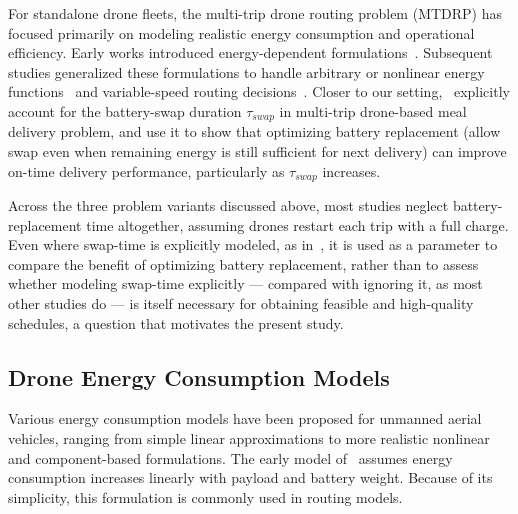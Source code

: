 \documentclass[3p, authoryear, 11pt]{elsarticle}
\begin{document}
For standalone drone fleets, the multi-trip drone routing problem (MTDRP) has focused primarily on modeling realistic energy consumption and operational efficiency. 
Early works introduced energy-dependent formulations~\citep{dorling_vehicle_2017,cheng_drone_2020}. 
Subsequent studies generalized these formulations to handle arbitrary or nonlinear energy functions~\citep{ahmadi-javid_delivery_2022} and variable-speed routing decisions~\citep{wu_energyefficient_2024}. 
Closer to our setting,~\citet{liu_ondemand_2026} explicitly account for the battery-swap duration $\tau_{swap}$ in multi-trip drone-based meal delivery problem, and use it to show that optimizing battery replacement (allow swap even when remaining energy is still sufficient for next delivery) can improve on-time delivery performance, particularly as $\tau_{swap}$ increases.

Across the three problem variants discussed above, most studies neglect battery-replacement time altogether, assuming drones restart each trip with a full charge. Even where swap-time is explicitly modeled, as in~\citep{liu_ondemand_2026}, it is used as a parameter to compare the benefit of optimizing battery replacement, rather than to assess whether modeling swap-time explicitly --- compared with ignoring it, as most other studies do --- is itself necessary for obtaining feasible and high-quality schedules, a question that motivates the present study.



\subsection{Drone Energy Consumption Models}

Various energy consumption models have been proposed for unmanned aerial vehicles, ranging from simple linear approximations to more realistic nonlinear and component-based formulations. 
The early model of~\citet{dorling_vehicle_2017} assumes energy consumption increases linearly with payload and battery weight. Because of its simplicity, this formulation is commonly used in routing models.
\end{document}
